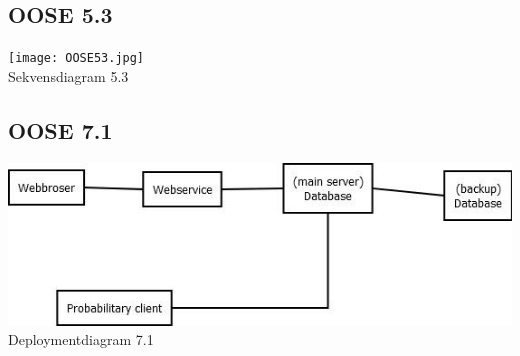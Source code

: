 \documentclass{article}
\begin{document}
\subsection{OOSE 5.3}
\texttt{[image: OOSE53.jpg]} \\{\footnotesize Sekvensdiagram 5.3}

\subsection{OOSE 7.1}
\includegraphics[scale=.5]{7_1.jpg} \\{\footnotesize Deploymentdiagram 7.1}
\end{document}
